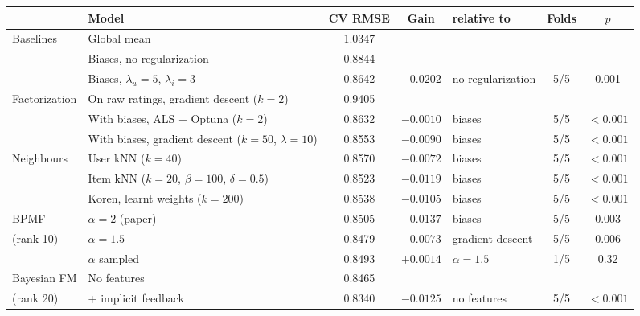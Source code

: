 \documentclass[10pt,a4paper,twocolumn]{article}
\begin{document}
\begin{table}[t]
\centering\small
\setlength{\tabcolsep}{4.5pt}
\begin{tabular}{@{}llcclcc@{}}
\toprule
 & Model & CV RMSE & Gain & relative to & Folds & $p$ \\
\midrule
Baselines     & Global mean                                   & 1.0347 &           &                    &     &        \\
              & Biases, no regularization                     & 0.8844 &           &                    &     &        \\
              & Biases, $\lambda_u=5$, $\lambda_i=3$          & 0.8642 & $-0.0202$ & no regularization  & 5/5 & 0.001  \\
\midrule
Factorization & On raw ratings, gradient descent ($k=2$)      & 0.9405 &           &                    &     &        \\
              & With biases, ALS + Optuna ($k=2$)             & 0.8632 & $-0.0010$ & biases             & 5/5 & $<0.001$ \\
              & With biases, gradient descent ($k=50$, $\lambda=10$) & 0.8553 & $-0.0090$ & biases      & 5/5 & $<0.001$ \\
\midrule
Neighbours    & User kNN ($k=40$)                             & 0.8570 & $-0.0072$ & biases             & 5/5 & $<0.001$ \\
              & Item kNN ($k=20$, $\beta=100$, $\delta=0.5$)  & 0.8523 & $-0.0119$ & biases             & 5/5 & $<0.001$ \\
              & Koren, learnt weights ($k=200$)               & 0.8538 & $-0.0105$ & biases             & 5/5 & $<0.001$ \\
\midrule
BPMF          & $\alpha = 2$ (paper)                          & 0.8505 & $-0.0137$ & biases             & 5/5 & 0.003  \\
(rank 10)     & $\alpha = 1.5$                                & 0.8479 & $-0.0073$ & gradient descent   & 5/5 & 0.006  \\
              & $\alpha$ sampled                              & 0.8493 & $+0.0014$ & $\alpha = 1.5$     & 1/5 & 0.32   \\
\midrule
Bayesian FM   & No features                                   & 0.8465 &           &                    &     &        \\
(rank 20)     & + implicit feedback                           & 0.8340 & $-0.0125$ & no features        & 5/5 & $<0.001$ \\

\end{tabular}
\end{table}
\end{document}

